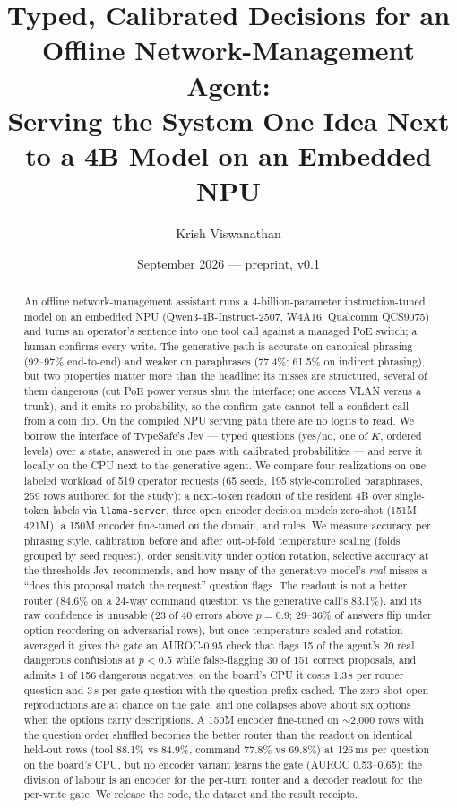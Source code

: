 \documentclass[11pt]{article}
\title{Typed, Calibrated Decisions for an Offline Network-Management Agent:\\
\large Serving the System One Idea Next to a 4B Model on an Embedded NPU}
\author{Krish Viswanathan}
\date{September 2026 --- preprint, v0.1}
\begin{document}
\maketitle

\begin{abstract}
An offline network-management assistant runs a 4-billion-parameter instruction-tuned model on
an embedded NPU (Qwen3-4B-Instruct-2507, W4A16, Qualcomm QCS9075) and turns an operator's
sentence into one tool call against a managed PoE switch; a human confirms every write. The
generative path is accurate on canonical phrasing (92--97\% end-to-end) and weaker on
paraphrases (77.4\%; 61.5\% on indirect phrasing), but two properties matter more than the
headline: its misses are structured, several of them dangerous (cut PoE power versus shut the
interface; one access VLAN versus a trunk), and it emits no probability, so the confirm gate
cannot tell a confident call from a coin flip. On the compiled NPU serving path there are no
logits to read. We borrow the interface of TypeSafe's Jev --- typed questions (yes/no, one of
$K$, ordered levels) over a state, answered in one pass with calibrated probabilities --- and
serve it locally on the CPU next to the generative agent. We compare four realizations on one
labeled workload of 519 operator requests (65 seeds, 195 style-controlled paraphrases, 259 rows
authored for the study): a next-token readout of the resident 4B over single-token labels via
\texttt{llama-server}, three open encoder decision models zero-shot (151M--421M), a 150M encoder
fine-tuned on the domain, and rules. We measure accuracy per phrasing style, calibration before
and after out-of-fold temperature scaling (folds grouped by seed request), order sensitivity under
option rotation, selective accuracy at the thresholds Jev recommends, and how many of the
generative model's \emph{real} misses a ``does this proposal match the request'' question flags.
The readout is not a better router (84.6\% on a 24-way command question vs the generative call's
83.1\%), and its raw confidence is unusable (23 of 40 errors above $p=0.9$; 29--36\% of answers
flip under option reordering on adversarial rows), but once temperature-scaled and
rotation-averaged it gives the gate an AUROC-0.95 check that flags 15 of the agent's 20 real
dangerous confusions at $p<0.5$ while false-flagging 30 of 151 correct proposals, and admits 1 of
156 dangerous negatives; on the board's CPU it costs 1.3\,s per router question and 3\,s per
gate question with the question prefix cached. The zero-shot open reproductions are at chance on
the gate, and one collapses above about six options when the options carry descriptions. A 150M encoder fine-tuned on $\sim$2,000 rows
with the question order shuffled becomes the better router than the readout on identical
held-out rows (tool 88.1\% vs 84.9\%, command 77.8\% vs 69.8\%) at 126\,ms per question on the
board's CPU, but no encoder variant learns the gate (AUROC 0.53--0.65): the division of labour
is an encoder for the per-turn router and a decoder readout for the per-write gate. We release
the code, the dataset and the result receipts.
\end{abstract}
\end{document}
